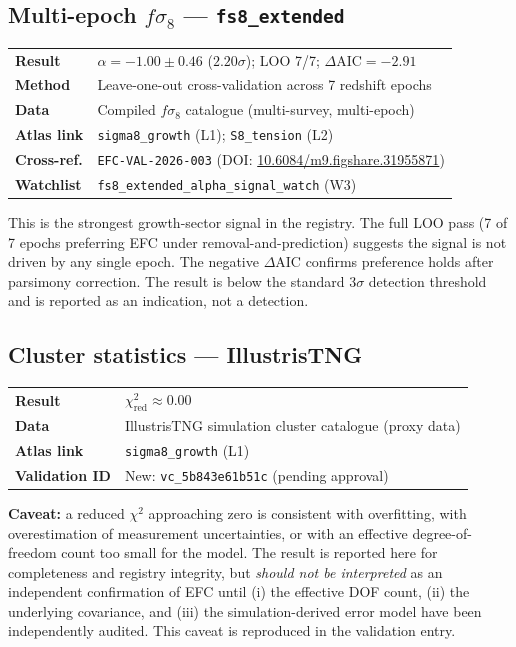 \documentclass[11pt,a4paper]{article}
\begin{document}
\subsection{Multi-epoch $f\sigma_8$ --- \texttt{fs8\_extended}}

\begin{tabular}{@{}lp{}@{}}
\textbf{Result} & $\alpha = -1.00 \pm 0.46$ ($2.20\sigma$); LOO 7/7; $\Delta\mathrm{AIC} = -2.91$ \\
\textbf{Method} & Leave-one-out cross-validation across 7 redshift epochs \\
\textbf{Data} & Compiled $f\sigma_8$ catalogue (multi-survey, multi-epoch) \\
\textbf{Atlas link} & \texttt{sigma8\_growth} (L1); \texttt{S8\_tension} (L2) \\
\textbf{Cross-ref.} & \texttt{EFC-VAL-2026-003} (DOI: \href{https://doi.org/10.6084/m9.figshare.31955871}{10.6084/m9.figshare.31955871}) \\
\textbf{Watchlist} & \texttt{fs8\_extended\_alpha\_signal\_watch} (W3) \\
\end{tabular}

\vspace{4pt}
This is the strongest growth-sector signal in the registry. The full LOO pass (7 of 7 epochs preferring EFC under removal-and-prediction) suggests the signal is not driven by any single epoch. The negative $\Delta\mathrm{AIC}$ confirms preference holds after parsimony correction. The result is below the standard $3\sigma$ detection threshold and is reported as an indication, not a detection.

\subsection{Cluster statistics --- IllustrisTNG}

\begin{tabular}{@{}lp{}@{}}
\textbf{Result} & $\chi^2_{\mathrm{red}} \approx 0.00$ \\
\textbf{Data} & IllustrisTNG simulation cluster catalogue (proxy data) \\
\textbf{Atlas link} & \texttt{sigma8\_growth} (L1) \\
\textbf{Validation ID} & New: \texttt{vc\_5b843e61b51c} (pending approval) \\
\end{tabular}

\begin{warnbox}
\textbf{Caveat:} a reduced $\chi^2$ approaching zero is consistent with overfitting, with overestimation of measurement uncertainties, or with an effective degree-of-freedom count too small for the model. The result is reported here for completeness and registry integrity, but \emph{should not be interpreted} as an independent confirmation of EFC until (i) the effective DOF count, (ii) the underlying covariance, and (iii) the simulation-derived error model have been independently audited. This caveat is reproduced in the validation entry.
\end{warnbox}
\end{document}
